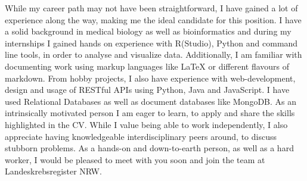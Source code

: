 \documentclass[11pt, a4paper]{awesome-cv}
\begin{document}
\begin{cvletter}
While my career path may not have been straightforward, I have gained a lot of experience along the way, making me the ideal candidate for this position.
I have a solid background in medical biology as well as bioinformatics and during my internships I gained hands on experience with R(Studio), Python and command line tools, in order to analyse and visualize data.
Additionally, I am familiar with documenting work using markup languages like LaTeX or different flavours of markdown.
From hobby projects, I also have experience with web-development, design and usage of RESTful APIs using Python, Java and JavaScript.
I have used Relational Databases as well as document databases like MongoDB.
As an intrinsically motivated person I am eager to learn, to apply and share the skills highlighted in the CV.
While I value being able to work independently, I also appreciate having knowledgeable interdisciplinary peers around, to discuss stubborn problems.
As a hands-on and down-to-earth person, as well as a hard worker, I would be pleased to meet with you soon and join the team at Landeskrebsregister NRW.
\end{cvletter}
\makeletterclosing
\end{document}
